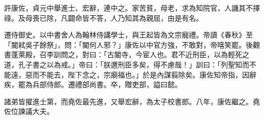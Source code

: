 \begin{pinyinscope}
 許康佐，貞元中舉進士、宏辭，連中之。家苦貧，母老，求為知院官，人譏其不擇祿。及母喪已除，凡闢命皆不答，人乃知其為親屈，由是有名。



 遷侍御史。以中書舍人為翰林侍講學士，與王起皆為文宗寵禮。帝讀《春秋》至「閽弒吳子餘祭」，問：「閽何人邪？」康佐以中官方強，不敢對，帝嘻笑罷。後觀書蓬萊殿，召李訓問之，對曰：「古閽寺，今宦人也。君不近刑臣，以為輕死之道，孔子書之以為戒。」帝曰：「朕邇刑臣多矣，得不慮哉！」訓曰：「列聖知而不能遠，惡而不能去，陛下念之，宗廟福也。」於是內謀翦除矣。康佐知帝指，因辭疾，罷為兵部侍郎。遷禮部尚書。卒，贈吏部，謚曰懿。



 諸弟皆擢進士第，而堯佐最先進，又舉宏辭，為太子校書郎。八年，康佐繼之。堯佐位諫議大夫。



\end{pinyinscope}